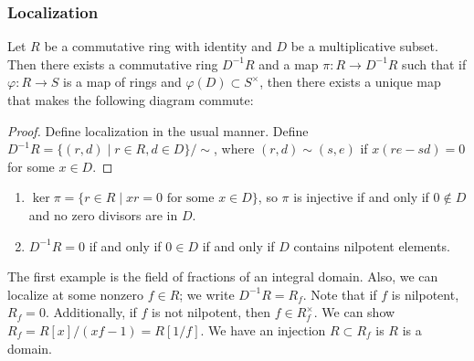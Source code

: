 \documentclass[10pt, twoside]{article}
\begin{document}
        \subsubsection{Localization}
        \begin{thm}
            Let $R$ be a commutative ring with identity and $D$ be a multiplicative subset. Then there exists a commutative ring $D^{-1}R$ and a map $\pi: R \to D^{-1}R$ such that if $\varphi:R \to S$ is a map of rings and $\varphi(D) \subset S^{\times}$, then there exists a unique map that makes the following diagram commute:
            \begin{center}
            \end{center}
            \begin{proof}
                Define localization in the usual manner. Define $D^{-1}R = \{(r,d) \mid r \in R, d \in D \}/\sim$, where $(r,d) \sim (s,e)$ if $x(re-sd) = 0$ for some $x \in D$.
            \end{proof}
        \end{thm}

        \begin{cor}
            \begin{enumerate}
                \item $\operatorname{ker}\pi = \{r \in R \mid xr=0 \text{ for some }x \in D \}$, so $\pi$ is injective if and only if $0 \notin D$ and no zero divisors are in $D$.
                \item $D^{-1}R = 0$ if and only if $0 \in D$ if and only if $D$ contains nilpotent elements.
            \end{enumerate}
        \end{cor}
        
        \begin{exm}
            The first example is the field of fractions of an integral domain. Also, we can localize at some nonzero $f \in R$; we write $D^{-1}R = R_f$. Note that if $f$ is nilpotent, $R_f = 0$. Additionally, if $f$ is not nilpotent, then $f \in R_f^{\times}$. We can show $R_f = R[x]/(xf-1) = R[1/f]$. We have an injection $R \subset R_f$ is $R$ is a domain.
        \end{exm}
\end{document}
